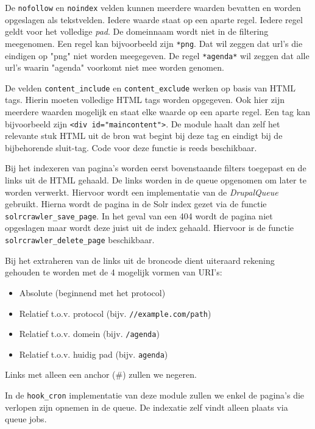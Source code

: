 De \texttt{nofollow} en \texttt{noindex} velden kunnen meerdere waarden bevatten en worden opgeslagen als tekstvelden. Iedere waarde staat op een aparte regel. Iedere regel geldt voor het volledige \emph{pad}. De domeinnaam wordt niet in de filtering meegenomen. Een regel kan bijvoorbeeld zijn \texttt{*png}. Dat wil zeggen dat url's die eindigen op "png" niet worden meegegeven. De regel \texttt{*agenda*} wil zeggen dat alle url's waarin "agenda" voorkomt niet mee worden genomen.

De velden \texttt{content\_include} en \texttt{content\_exclude} werken op basis van HTML tags. Hierin moeten volledige HTML tags worden opgegeven. Ook hier zijn meerdere waarden mogelijk en staat elke waarde op een aparte regel. Een tag kan bijvoorbeeld zijn \texttt{<div id="maincontent">}. De module haalt dan zelf het relevante stuk HTML uit de bron wat begint bij deze tag en eindigt bij de bijbehorende sluit-tag. Code voor deze functie is reeds beschikbaar.

Bij het indexeren van pagina's worden eerst bovenstaande filters toegepast en de links uit de HTML gehaald. De links worden in de queue opgenomen om later te worden verwerkt. Hiervoor wordt een implementatie van de \emph{DrupalQueue} gebruikt.
Hierna wordt de pagina in de Solr index gezet via de functie \texttt{solrcrawler\_save\_page}. In het geval van een 404 wordt de pagina niet opgeslagen maar wordt deze juist uit de index gehaald. Hiervoor is de functie \texttt{solrcrawler\_delete\_page} beschikbaar.

Bij het extraheren van de links uit de broncode dient uiteraard rekening gehouden te worden met de 4 mogelijk vormen van URI's:
\begin{itemize}
\item Absolute (beginnend met het protocol)
\item Relatief t.o.v. protocol (bijv. \texttt{//example.com/path})
\item Relatief t.o.v. domein (bijv. \texttt{/agenda})
\item Relatief t.o.v. huidig pad (bijv. \texttt{agenda})
\end{itemize}
Links met alleen een anchor (\#) zullen we negeren.

In de \texttt{hook\_cron} implementatie van deze module zullen we enkel de pagina's die verlopen zijn opnemen in de queue. De indexatie zelf vindt alleen plaats via queue jobs.

